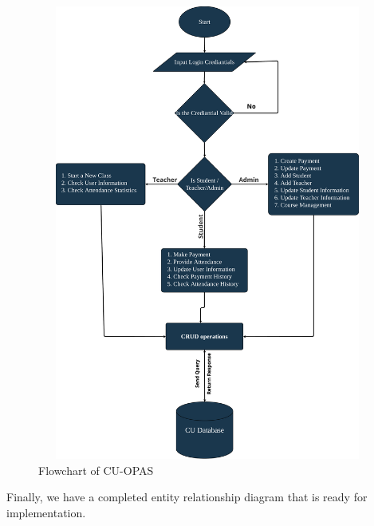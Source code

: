 \begin{figure}[H]
    \centering
    \label{fig:flowchart}
    \includegraphics[height=15cm, width=1\textwidth]{images/flowchart}
    \caption{Flowchart of CU-OPAS}
\end{figure}
Finally, we have a completed entity relationship diagram that is ready for implementation.

